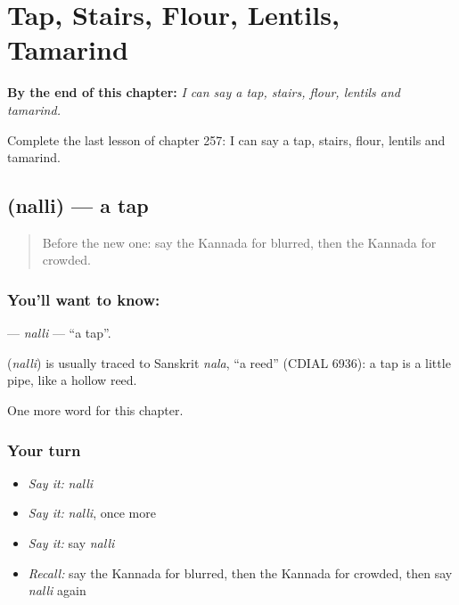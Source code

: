 
\chapter{Tap, Stairs, Flour, Lentils, Tamarind}
\label{ch:ka-tap-stairs-flour-lentils-tamarind}

\begin{chapteropening}
\textbf{By the end of this chapter:} \emph{I can say a tap, stairs, flour, lentils and tamarind.}

Complete the last lesson of chapter 257: I can say a tap, stairs, flour, lentils and tamarind.
\end{chapteropening}

\section[\texorpdfstring{\kn{ನಲ್ಲಿ} (nalli)}{ನಲ್ಲಿ (nalli)}]{ (nalli) — a tap}

\label{lesson:KA-C257-nalli}



\begin{quote}
Before the new one: say the Kannada for blurred, then the Kannada for crowded.
\end{quote}

\subsection*{You'll want to know: }
\textbf{} — \emph{nalli} — \textquotedblleft{}a tap\textquotedblright{}.

\begin{cousinweb}
\textbf{} (\emph{nalli}) is usually traced to Sanskrit \emph{nala}, \textquotedblleft{}a reed\textquotedblright{} (CDIAL 6936): a tap is a little pipe, like a hollow reed.
\end{cousinweb}

\begin{grammarlens}[title={What you've built}]
One more word for this chapter.
\end{grammarlens}

\subsection*{Your turn}
\begin{itemize}
\raggedright
  \item \emph{Say it:} \emph{nalli}
  \item \emph{Say it:} \emph{nalli}, once more
  \item \emph{Say it:} say \emph{nalli}
  \item \emph{Recall:} say the Kannada for blurred, then the Kannada for crowded, then say \emph{nalli} again
\end{itemize}

